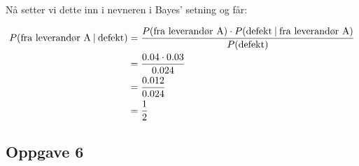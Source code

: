 \begin{easylist}[enumerate]
	Nå setter vi dette inn i nevneren i Bayes' setning og får:
	
	\begin{equation*}
		\begin{aligned}
			P(\textnormal{fra leverandør A} \: | \:  \textnormal{defekt}) &= \frac{P(\textnormal{fra leverandør A}) \cdot P(\textnormal{defekt} \: | \: \textnormal{fra leverandør A})}{P(\textnormal{defekt})} \\
			& = \frac{0.04 \cdot 0.03}{0.024} \\
			& = \frac{0.012}{0.024} \\
			& = \frac{1}{2}
		\end{aligned}
	\end{equation*}	
	
\end{easylist}


	
\subsection*{Oppgave 6}

